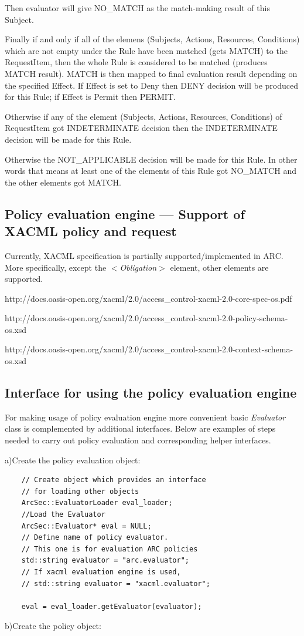 \documentclass{article}                            %
\begin{document}
Then evaluator will give NO\_MATCH as the match-making result of this Subject.

Finally if and only if all of the elemens (Subjects, Actions, Resources, Conditions) which are not empty under the Rule have been matched (gets MATCH) to the RequestItem, then the whole Rule is considered to be matched (produces MATCH result). MATCH is then mapped to final evaluation result depending on the specified Effect. If Effect is set to Deny then DENY decision will be produced for this Rule; if Effect is Permit then PERMIT.

Otherwise if any of the element (Subjects, Actions, Resources, Conditions) of RequestItem got INDETERMINATE decision then the INDETERMINATE decision will be made for this Rule.

Otherwise the NOT\_APPLICABLE decision will be made for this Rule. In other words that means at least one of the elements of this Rule got NO\_MATCH and the other elements got MATCH.

\subsection{Policy evaluation engine --- Support of XACML policy and request} %
\label{subsec:policy_engine_xacml}
Currently, XACML specification is partially supported/implemented in ARC. More specifically, except the \textit{$<$Obligation$>$} element, other elements are supported.

http://docs.oasis-open.org/xacml/2.0/access\_control-xacml-2.0-core-spec-os.pdf

http://docs.oasis-open.org/xacml/2.0/access\_control-xacml-2.0-policy-schema-os.xsd

http://docs.oasis-open.org/xacml/2.0/access\_control-xacml-2.0-context-schema-os.xsd


\subsection{Interface for using the policy evaluation engine} %
\label{subsec:interface_policy_engine}

For making usage of policy evaluation engine more convenient basic \textit{Evaluator} class is complemented by additional interfaces. Below are examples of steps needed to carry out policy evaluation and corresponding helper interfaces.

a)Create the policy evaluation object:

\begin{verbatim}
    // Create object which provides an interface
    // for loading other objects
    ArcSec::EvaluatorLoader eval_loader;
    //Load the Evaluator
    ArcSec::Evaluator* eval = NULL;
    // Define name of policy evaluator.
    // This one is for evaluation ARC policies
    std::string evaluator = "arc.evaluator";
    // If xacml evaluation engine is used,
    // std::string evaluator = "xacml.evaluator";

    eval = eval_loader.getEvaluator(evaluator);
\end{verbatim}
b)Create the policy object:
\end{document}
